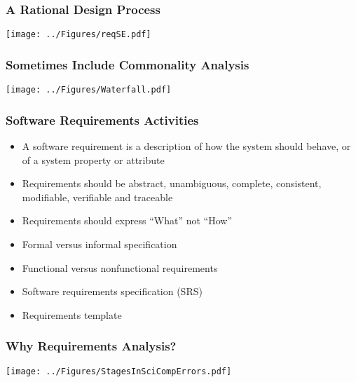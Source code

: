 \documentclass[t,12pt,numbers,fleqn]{beamer}
\begin{document}

\begin{frame}
\frametitle{A Rational Design Process}
\begin{center}
 \texttt{[image: ../Figures/reqSE.pdf]}
\end{center}
\end{frame}


\begin{frame}
\frametitle{Sometimes Include Commonality Analysis}
\begin{center}
 \texttt{[image: ../Figures/Waterfall.pdf]}
\end{center}
\end{frame}


\begin{frame}
\frametitle{Software Requirements Activities}
\begin{itemize}
\item A software requirement is a description of how the system should behave,
  or of a system property or attribute
\item Requirements should be abstract, unambiguous, complete, consistent,
  modifiable, verifiable and traceable
\item Requirements should express ``What'' not ``How''
\item Formal versus informal specification
\item Functional versus nonfunctional requirements
\item Software requirements specification (SRS)
\item Requirements template
\end{itemize}
\end{frame}


\begin{frame}
\frametitle{Why Requirements Analysis?}
\begin{center}
 \texttt{[image: ../Figures/StagesInSciCompErrors.pdf]}
\end{center}
\end{frame}
\end{document}
